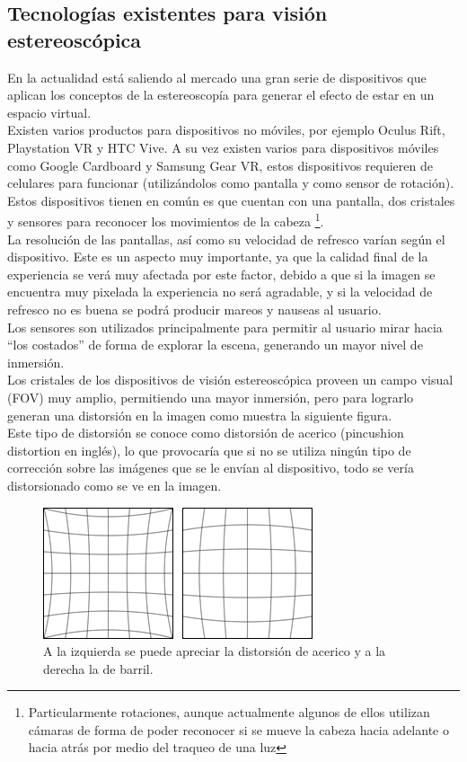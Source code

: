 \documentclass[12pt]{article}
\begin{document}
\subsection{Tecnologías existentes para visión estereoscópica}
En la actualidad está saliendo al mercado una gran serie de dispositivos que aplican los conceptos de la estereoscopía para generar el efecto de estar en un espacio virtual.
\\Existen varios productos para dispositivos no móviles, por ejemplo  Oculus Rift\cite{oculus}, Playstation VR\cite{psvr} y HTC Vive\cite{htcvive}. A su vez existen varios para dispositivos móviles como  Google Cardboard\cite{cardboard} y  Samsung Gear VR\cite{samsungvr}, estos dispositivos requieren de celulares para funcionar (utilizándolos como pantalla y como sensor de rotación).
\\Estos dispositivos tienen en común es que cuentan con una pantalla, dos cristales y sensores para reconocer los movimientos de la cabeza \footnote{Particularmente rotaciones, aunque actualmente algunos de ellos utilizan cámaras de forma de poder reconocer si se mueve la cabeza hacia adelante o hacia atrás por medio del traqueo de una luz}.
\\La resolución de las pantallas, así como su velocidad de refresco varían según el dispositivo. Este es un aspecto muy importante, ya que la calidad final de la experiencia se verá muy afectada por este factor, debido a que si la imagen se encuentra muy pixelada la experiencia no será agradable, y si la velocidad de refresco no es buena se podrá producir mareos y nauseas al usuario.
\\Los sensores son utilizados principalmente para permitir al usuario mirar hacia “los costados” de forma de explorar la escena, generando un mayor nivel de inmersión.
\\Los cristales de los dispositivos de visión estereoscópica proveen un campo visual (FOV) muy amplio, permitiendo una mayor inmersión, pero para lograrlo generan una distorsión\cite{oculusrendering} en la imagen como muestra la siguiente figura. 
\\Este tipo de distorsión se conoce como  distorsión de acerico (pincushion distortion en inglés), lo que provocaría que si no se utiliza ningún tipo de corrección sobre las imágenes que se le envían al dispositivo, todo se vería distorsionado como se ve en la imagen.
\begin{figure}[h!]
\includegraphics[width =0.6\linewidth, center]{ace-bar.png}
\caption{ A la izquierda se puede apreciar la distorsión de acerico y a la derecha la de barril.}
\label{ fig : surface }
\end{figure}
\end{document}
